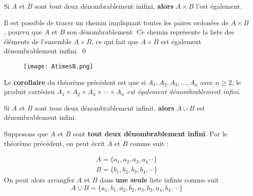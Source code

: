 \documentclass[16pt]{report}
\begin{document}
\begin{multicols*}{2}
            \begin{Theorem}{}{}
                Si $A$ et $B$ sont tout deux dénombrablement inifini, \textbf{alors} $A \times B$ l'est également.
            \end{Theorem}

            \begin{Preuve}{}{}
                Il est possible de tracer un chemin impliquant toutes les paires ordonées 
                de $A \times B$, pourvu que $A$ et $B$ son dénombrablement. Ce chemin représente la 
                liste des éléments de l'ensemble $A \times B$, ce qui fait que $A \times B$ est 
                également dénombrablement inifini. \qed
            \end{Preuve}


            \begin{figure}[H]
                \begin{center}
                    \texttt{[image: AtimesB.png]}
                \end{center}
            \end{figure}

            \begin{note}{}{}
                Le \textbf{corollaire} du théorème précédent est que si $A_1, A_2, A_3,  \dots, A_n$ avec 
                $n \geq 2$, le produit cartésien $A_1 \times A_2 \times A_3 \times \cdots \times A_n$ 
                \textit{est également dénombrablement infini}. 
            \end{note}


            \begin{Theorem}{}
                Si $A$ et $B$ sont tous deux dénombrablement infinit, \textbf{alors} $A \cup B$ est 
                dénombrablement infini. 
            \end{Theorem}

            \begin{Preuve}{}{}
                Supposons que $A$ et $B$ sont \textbf{tout deux dénombrablement infini}. Par le théorème précédent, 
                on peut écrit $A$ et $B$ comme suit : 

                \begin{align*}
                    A = \{a_1, a_2, a_3, a_4 \cdots \} \\ 
                    B = \{b_1, b_2, b_3, b_4, \cdots \}
                \end{align*}
                On peut alors arrangfer $A$ et $B$ dans \textbf{une seule} liste infinie comme suit 
                                \[ A \cup B = \{a_1, b_1, a_2, b_2, a_3, b_3, a_4, b_4, \cdots \} \]



\end{Preuve}
\end{multicols*}
\end{document}
